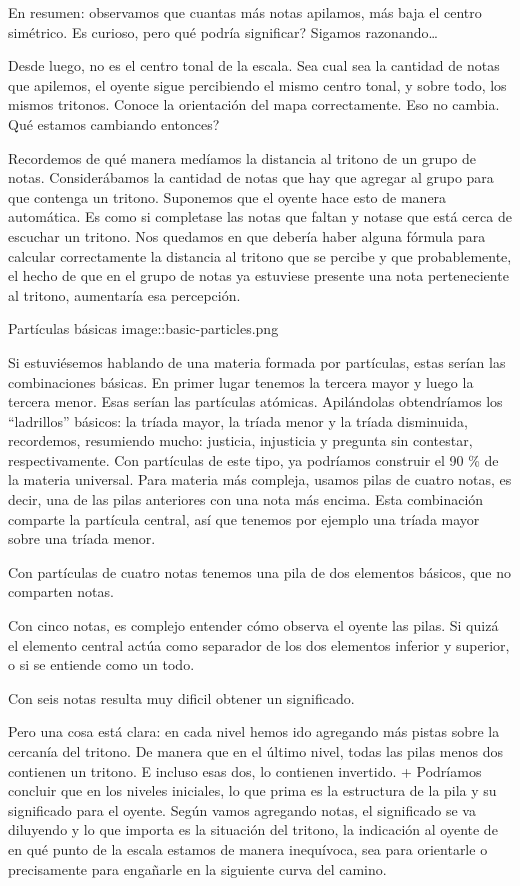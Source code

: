 \documentclass[]{article}
\begin{document}
En resumen: observamos que cuantas más notas apilamos, más baja el centro simétrico. Es curioso, pero qué podría significar? Sigamos razonando\ldots{}

Desde luego, no es el centro tonal de la escala. Sea cual sea la cantidad de notas que apilemos, el oyente sigue percibiendo el mismo centro tonal, y sobre todo, los mismos tritonos. Conoce la orientación del mapa correctamente. Eso no cambia. Qué estamos cambiando entonces?

Recordemos de qué manera medíamos la distancia al tritono de un grupo de notas. Considerábamos la cantidad de notas que hay que agregar al grupo para que contenga un tritono. Suponemos que el oyente hace esto de manera automática. Es como si completase las notas que faltan y notase que está cerca de escuchar un tritono. Nos quedamos en que debería haber alguna fórmula para calcular correctamente la distancia al tritono que se percibe y que probablemente, el hecho de que en el grupo de notas ya estuviese presente una nota perteneciente al tritono, aumentaría esa percepción.

Partículas básicas image::basic-particles.png

Si estuviésemos hablando de una materia formada por partículas, estas serían las combinaciones básicas. En primer lugar tenemos la tercera mayor y luego la tercera menor. Esas serían las partículas atómicas. Apilándolas obtendríamos los ``ladrillos'' básicos: la tríada mayor, la tríada menor y la tríada disminuida, recordemos, resumiendo mucho: justicia, injusticia y pregunta sin contestar, respectivamente. Con partículas de este tipo, ya podríamos construir el 90 \% de la materia universal. Para materia más compleja, usamos pilas de cuatro notas, es decir, una de las pilas anteriores con una nota más encima. Esta combinación comparte la partícula central, así que tenemos por ejemplo una tríada mayor sobre una tríada menor.

Con partículas de cuatro notas tenemos una pila de dos elementos básicos, que no comparten notas.

Con cinco notas, es complejo entender cómo observa el oyente las pilas. Si quizá el elemento central actúa como separador de los dos elementos inferior y superior, o si se entiende como un todo.

Con seis notas resulta muy dificil obtener un significado.

Pero una cosa está clara: en cada nivel hemos ido agregando más pistas sobre la cercanía del tritono. De manera que en el último nivel, todas las pilas menos dos contienen un tritono. E incluso esas dos, lo contienen invertido. + Podríamos concluir que en los niveles iniciales, lo que prima es la estructura de la pila y su significado para el oyente. Según vamos agregando notas, el significado se va diluyendo y lo que importa es la situación del tritono, la indicación al oyente de en qué punto de la escala estamos de manera inequívoca, sea para orientarle o precisamente para engañarle en la siguiente curva del camino.
\end{document}
